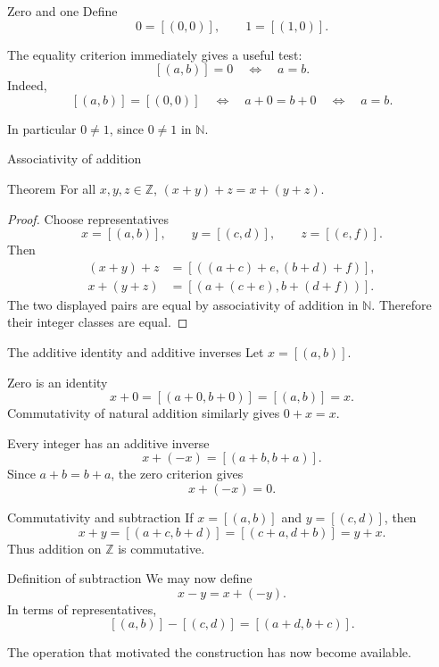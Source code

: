 \documentclass[aspectratio=169,11pt]{beamer}
\newcommand{\N}{\mathbb N}
\newcommand{\Z}{\mathbb Z}
\newcommand{\cl}[2]{\left[(#1,#2)\right]}
\begin{document}
\begin{frame}{Zero and one}
  Define
  \[
    0=\cl{0}{0},
    \qquad
    1=\cl{1}{0}.
  \]

  The equality criterion immediately gives a useful test:
  \[
    \boxed{\cl{a}{b}=0\quad\Longleftrightarrow\quad a=b.}
  \]
  Indeed,
  \[
    \cl{a}{b}=\cl{0}{0}
    \quad\Longleftrightarrow\quad
    a+0=b+0
    \quad\Longleftrightarrow\quad
    a=b.
  \]

  In particular \(0\ne1\), since \(0\ne1\) in \(\N\).
\end{frame}

\begin{frame}{Associativity of addition}
  \small
  \begin{block}{Theorem}
    For all \(x,y,z\in\Z\), \((x+y)+z=x+(y+z)\).
  \end{block}

  \begin{proof}
    Choose representatives
    \[
      x=\cl{a}{b},\qquad y=\cl{c}{d},\qquad z=\cl{e}{f}.
    \]
    Then
    \begin{align*}
      (x+y)+z
        &=\cl{(a+c)+e}{(b+d)+f},\\
      x+(y+z)
        &=\cl{a+(c+e)}{b+(d+f)}.
    \end{align*}
    The two displayed pairs are equal by associativity of addition in \(\N\).
    Therefore their integer classes are equal.
  \end{proof}
\end{frame}

\begin{frame}{The additive identity and additive inverses}
  Let \(x=\cl{a}{b}\).

  \begin{block}{Zero is an identity}
    \[
      x+0=\cl{a+0}{b+0}=\cl{a}{b}=x.
    \]
    Commutativity of natural addition similarly gives \(0+x=x\).
  \end{block}

  \begin{block}{Every integer has an additive inverse}
    \[
      x+(-x)=\cl{a+b}{b+a}.
    \]
    Since \(a+b=b+a\), the zero criterion gives
    \[
      x+(-x)=0.
    \]
  \end{block}
\end{frame}

\begin{frame}{Commutativity and subtraction}
  If \(x=\cl{a}{b}\) and \(y=\cl{c}{d}\), then
  \[
    x+y=\cl{a+c}{b+d}
       =\cl{c+a}{d+b}
       =y+x.
  \]
  Thus addition on \(\Z\) is commutative.

  \begin{block}{Definition of subtraction}
    We may now define
    \[
      x-y=x+(-y).
    \]
    In terms of representatives,
    \[
      \cl{a}{b}-\cl{c}{d}
        =\cl{a+d}{b+c}.
    \]
  \end{block}

  The operation that motivated the construction has now become available.
\end{frame}
\end{document}
